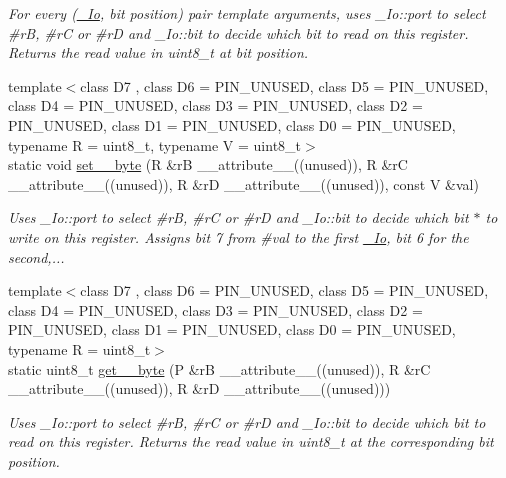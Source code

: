 \begin{DoxyCompactItemize}
\begin{DoxyCompactList}\small\item\em For every (\hyperlink{structports_1_1__Io}{\+\_\+\+Io}, \textquotesingle{}bit position\textquotesingle{}) pair template arguments, uses \+\_\+\+Io\+::port to select \#rB, \#rC or \#rD and \+\_\+\+Io\+::bit to decide which bit to read on this register. Returns the read value in uint8\+\_\+t at \textquotesingle{}bit position\textquotesingle{}. \end{DoxyCompactList}\item 
{\footnotesize template$<$class D7 , class D6  = P\+I\+N\+\_\+\+U\+N\+U\+S\+ED, class D5  = P\+I\+N\+\_\+\+U\+N\+U\+S\+ED, class D4  = P\+I\+N\+\_\+\+U\+N\+U\+S\+ED, class D3  = P\+I\+N\+\_\+\+U\+N\+U\+S\+ED, class D2  = P\+I\+N\+\_\+\+U\+N\+U\+S\+ED, class D1  = P\+I\+N\+\_\+\+U\+N\+U\+S\+ED, class D0  = P\+I\+N\+\_\+\+U\+N\+U\+S\+ED, typename R  = uint8\+\_\+t, typename V  = uint8\+\_\+t$>$ }\\static void \hyperlink{namespaceports_a19c06fd6aa6bf54de902e8ac44cc2e56}{set\+\_\+\_\+byte} (R \&rB \+\_\+\+\_\+attribute\+\_\+\+\_\+((unused)), R \&rC \+\_\+\+\_\+attribute\+\_\+\+\_\+((unused)), R \&rD \+\_\+\+\_\+attribute\+\_\+\+\_\+((unused)), const V \&val)
\begin{DoxyCompactList}\small\item\em Uses \+\_\+\+Io\+::port to select \#rB, \#rC or \#rD and \+\_\+\+Io\+::bit to decide which bit $\ast$ to write on this register. Assigns bit 7 from \#val to the first \hyperlink{structports_1_1__Io}{\+\_\+\+Io}, bit 6 for the second,... \end{DoxyCompactList}\item 
{\footnotesize template$<$class D7 , class D6  = P\+I\+N\+\_\+\+U\+N\+U\+S\+ED, class D5  = P\+I\+N\+\_\+\+U\+N\+U\+S\+ED, class D4  = P\+I\+N\+\_\+\+U\+N\+U\+S\+ED, class D3  = P\+I\+N\+\_\+\+U\+N\+U\+S\+ED, class D2  = P\+I\+N\+\_\+\+U\+N\+U\+S\+ED, class D1  = P\+I\+N\+\_\+\+U\+N\+U\+S\+ED, class D0  = P\+I\+N\+\_\+\+U\+N\+U\+S\+ED, typename R  = uint8\+\_\+t$>$ }\\static uint8\+\_\+t \hyperlink{namespaceports_ad7c53c89524885166881b936005b731e}{get\+\_\+\_\+byte} (P \&rB \+\_\+\+\_\+attribute\+\_\+\+\_\+((unused)), R \&rC \+\_\+\+\_\+attribute\+\_\+\+\_\+((unused)), R \&rD \+\_\+\+\_\+attribute\+\_\+\+\_\+((unused)))
\begin{DoxyCompactList}\small\item\em Uses \+\_\+\+Io\+::port to select \#rB, \#rC or \#rD and \+\_\+\+Io\+::bit to decide which bit to read on this register. Returns the read value in uint8\+\_\+t at the corresponding bit position. \end{DoxyCompactList}\item 

\end{DoxyCompactItemize}
